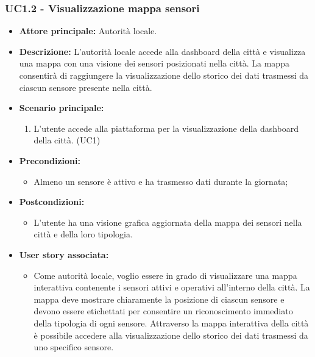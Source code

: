 \subsubsection{UC1.2 - Visualizzazione mappa sensori}
\begin{itemize}
    \item \textbf{Attore principale:} Autorità locale.
    \item \textbf{Descrizione:} L'autorità locale accede alla dashboard della città e visualizza una mappa con una visione dei sensori posizionati nella città. 
    La mappa consentirà di raggiungere la visualizzazione dello storico dei dati trasmessi da ciascun sensore presente nella città.
    \item \textbf{Scenario principale:}
          \begin{enumerate}
            \item L'utente accede alla piattaforma per la visualizzazione della dashboard della città. (UC1)
        \end{enumerate}
    \item \textbf{Precondizioni:}
          \begin{itemize}
              \item  Almeno un sensore è attivo e ha trasmesso dati durante la giornata;
          \end{itemize}
    \item \textbf{Postcondizioni:}
          \begin{itemize}
              \item      L'utente ha una visione grafica aggiornata della mappa dei sensori nella città e della loro tipologia.
          \end{itemize}
    \item \textbf{User story associata:}
          \begin{itemize}
              \item Come autorità locale, voglio essere in grado di visualizzare una mappa interattiva contenente i sensori attivi e operativi all'interno della città. La mappa deve mostrare chiaramente la posizione di ciascun sensore e devono essere etichettati per consentire un riconoscimento immediato della tipologia di ogni sensore.
              Attraverso la mappa interattiva della città è possibile accedere alla visualizzazione dello storico dei dati trasmessi da uno specifico sensore.

          \end{itemize}
\end{itemize}